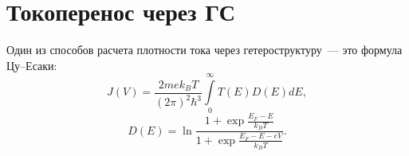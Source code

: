 \section{Токоперенос через ГС}
Один из способов расчета плотности тока через гетероструктуру~--- это формула Цу--Есаки:
\begin{equation}
	\label{eq:J}
	J(V) = \frac{2mek_{B}T}{(2\pi)^{2}\hbar^{3}}\int\limits_{0}^{\infty}T(E)D(E)dE,
\end{equation}
\begin{equation}
	D(E) = \ln\frac{1 + \exp{\frac{E_{F}-E}{k_{B}T}} }{ 1 + \exp{\frac{E_{F}-E-eV}{k_{B}T}} }.
\end{equation}

